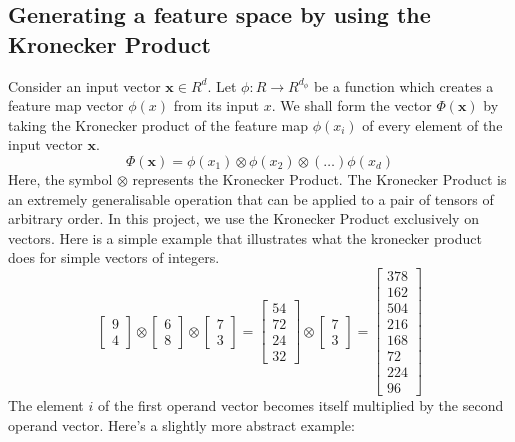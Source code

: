 \documentclass{article}
\theoremstyle{definition}
\theoremstyle{definition}
\begin{document}
\subsection{Generating a feature space by using the Kronecker Product}
Consider an input vector $\mathbf{x} \in R^d$. Let $\phi : R \to R^{d_{\phi}}$ be a function which creates a feature map vector $\phi(x)$ from its input $x$.  We shall form the vector $\Phi(\mathbf{x})$ by taking the Kronecker product of the feature map $\phi(x_i)$ of every element of the input vector $\mathbf{x}$.
\begin{equation}
    \Phi(\mathbf{x}) = \phi(x_1) \otimes  \phi(x_2) 
                \otimes (\dots) \phi(x_d)
\end{equation}
Here, the symbol $\otimes$ represents the Kronecker Product. The Kronecker Product is an extremely generalisable operation that can be applied to a pair of tensors of arbitrary order. In this project, we use the Kronecker Product exclusively on vectors. Here is a simple example that illustrates what the kronecker product does for simple vectors of integers.
\[
\begin{bmatrix}
    9 \\ 4
\end{bmatrix}
\otimes
\begin{bmatrix}
    6 \\ 8
\end{bmatrix}
\otimes
\begin{bmatrix}
    7 \\ 3
\end{bmatrix}
=
\begin{bmatrix}
    54 \\ 72 \\ 24 \\ 32
\end{bmatrix}
\otimes
\begin{bmatrix}
    7 \\ 3
\end{bmatrix}
=
\begin{bmatrix}
    378 \\ 162\\ 504 \\216\\ 168\\ 72\\ 224\\ 96
\end{bmatrix}
\]
The element $i$ of the first operand vector becomes itself multiplied by the second operand vector. Here's a slightly more abstract example:
\end{document}
